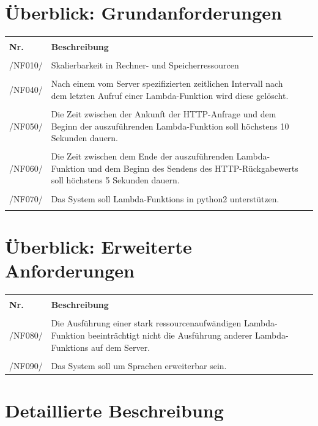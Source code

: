 \documentclass[a4paper,20pt,oneside]{book}
\begin{document}
\section{Überblick: Grundanforderungen}
\begin{longtable}{lp{10cm}l}
\hline \\
\textbf{Nr.} &  \textbf{Beschreibung} \\ \hline \hline \\ \endhead
/NF010/ & Skalierbarkeit in Rechner- und Speicherressourcen\\ \hline \\
/NF040/ & Nach einem vom Server spezifizierten zeitlichen Intervall nach dem letzten Aufruf einer \gls{Lambda-Funktion} wird diese gelöscht. \\ \hline \\
/NF050/ & Die Zeit zwischen der Ankunft der HTTP-Anfrage und dem Beginn der auszuführenden \gls{Lambda-Funktion} soll höchstens 10 Sekunden dauern. \\ \hline \\
/NF060/ & Die Zeit zwischen dem Ende der auszuführenden \gls{Lambda-Funktion} und dem Beginn des Sendens des HTTP-Rückgabewerts soll höchstens 5 Sekunden dauern. \\ \hline  \\
/NF070/ & Das System soll \glspl{Lambda-Funktion} in python2 unterstützen. \\ \\
\hline
\hline
\end{longtable}
\hspace{3mm}
\section{Überblick: Erweiterte Anforderungen}
\begin{longtable}{lp{10cm}l}
\hline \\
\textbf{Nr.} &  \textbf{Beschreibung} \\ \hline \hline \\ \endhead
/NF080/ & Die Ausführung einer stark ressourcenaufwändigen \Gls{Lambda-Funktion} beeinträchtigt nicht die Ausführung anderer \Glspl{Lambda-Funktion} auf dem \Gls{Server}. \\ \hline \\
/NF090/ & Das System soll um Sprachen erweiterbar sein. \\
\hline
\hline
\end{longtable}
\section{Detaillierte Beschreibung}
\end{document}
